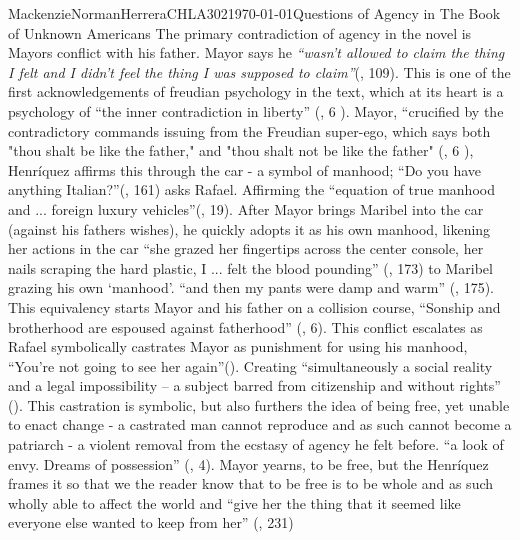 \documentclass{article}
\begin{document}
\begin{mla}{Mackenzie}{Norman}{Herrera}{CHLA302}{\today}{Questions of Agency in The Book of Unknown Americans}
The primary contradiction of agency in the novel is Mayors conflict with his father. Mayor says he 
\textit{``wasn’t allowed to claim the thing I felt and I didn’t feel the thing I was supposed to claim''}(\cite{Henriquez2014-sh}, 109). This is one of the first acknowledgements of freudian psychology in the text, which at its heart is a psychology of ``the inner contradiction in liberty'' (\cite{loves-bdy}, 6 ).
Mayor, ``crucified by the contradictory commands issuing from the Freudian super-ego, which says both "thou shalt be like the father," and "thou shalt not be like the father" (\cite{loves-bdy}, 6 ), Henríquez affirms this through the car - a symbol of manhood; ``Do you have anything Italian?''(\cite{Henriquez2014-sh}, 161) asks Rafael. Affirming the ``equation of  true manhood and ... foreign luxury vehicles''(\cite{Uhlman2015-qx}, 19). After Mayor brings Maribel into the car (against his fathers wishes), he quickly adopts it as his own manhood, likening her actions in the car ``she grazed her fingertips across the center console, her nails scraping the hard plastic, I ... felt the blood pounding'' (\cite{Henriquez2014-sh}, 173) to Maribel grazing his own `manhood'. ``and then my pants were damp and warm'' (\cite{Henriquez2014-sh}, 175). This equivalency starts Mayor and his father on a collision course, ``Sonship and brotherhood are espoused against fatherhood'' (\cite{loves-bdy}, 6). This conflict escalates as Rafael symbolically castrates Mayor as punishment for using his manhood, ``You're not going to see her again''(\cite{Henriquez2014-sh}). Creating  ``simultaneously a social reality and a legal impossibility – a subject barred from citizenship and without rights'' (\cite{Lutes_Travis_2021}). This castration is symbolic, but also furthers the idea of being free, yet unable to enact change - a castrated man cannot reproduce and as such cannot become a patriarch - a violent removal from the ecstasy of agency he felt before. ``a look of envy. Dreams of possession'' (\cite{wretched}, 4). Mayor yearns, to be free, but the Henríquez frames it so that we the reader know that to be free is to be whole and as such wholly able to affect the world and ``give her the thing that it seemed like everyone else wanted to keep from her'' (\cite{Henriquez2014-sh}, 231) 


\end{mla}
\end{document}
